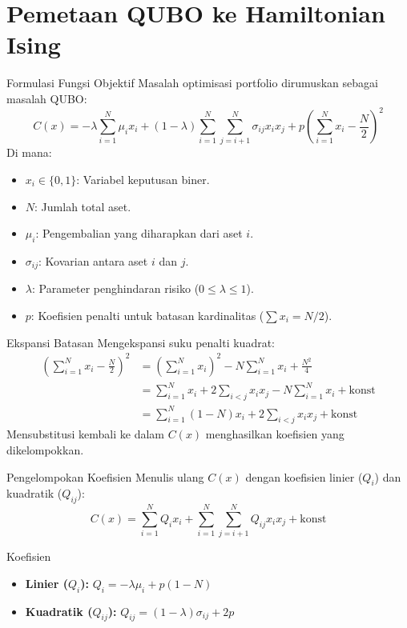 \section{Pemetaan QUBO ke Hamiltonian Ising}

\begin{frame}{Formulasi Fungsi Objektif}
    Masalah optimisasi portfolio dirumuskan sebagai masalah QUBO:
    \begin{equation}
        C(x) = -\lambda \sum_{i=1}^{N} \mu_i x_i + (1-\lambda) \sum_{i=1}^{N} \sum_{j=i+1}^{N} \sigma_{ij} x_i x_j + p \left( \sum_{i=1}^{N} x_i - \frac{N}{2} \right)^2
    \end{equation}
    Di mana:
    \begin{itemize}
        \item $x_i \in \{0, 1\}$: Variabel keputusan biner.
        \item $N$: Jumlah total aset.
        \item $\mu_i$: Pengembalian yang diharapkan dari aset $i$.
        \item $\sigma_{ij}$: Kovarian antara aset $i$ dan $j$.
        \item $\lambda$: Parameter penghindaran risiko ($0 \le \lambda \le 1$).
        \item $p$: Koefisien penalti untuk batasan kardinalitas ($\sum x_i = N/2$).
    \end{itemize}
\end{frame}

\begin{frame}{Ekspansi Batasan}
    Mengekspansi suku penalti kuadrat:
    \begin{align*}
        \left( \sum_{i=1}^{N} x_i - \frac{N}{2} \right)^2 &= \left( \sum_{i=1}^{N} x_i \right)^2 - N \sum_{i=1}^{N} x_i + \frac{N^2}{4} \\
        &= \sum_{i=1}^{N} x_i + 2 \sum_{i<j} x_i x_j - N \sum_{i=1}^{N} x_i + \text{konst} \\
        &= \sum_{i=1}^{N} (1 - N) x_i + 2 \sum_{i<j} x_i x_j + \text{konst}
    \end{align*}
    Mensubstitusi kembali ke dalam $C(x)$ menghasilkan koefisien yang dikelompokkan.
\end{frame}

\begin{frame}{Pengelompokan Koefisien}
    Menulis ulang $C(x)$ dengan koefisien linier ($Q_i$) dan kuadratik ($Q_{ij}$):
    \begin{equation}
        C(x) = \sum_{i=1}^{N} Q_i x_i + \sum_{i=1}^{N} \sum_{j=i+1}^{N} Q_{ij} x_i x_j + \text{konst}
    \end{equation}
    \begin{block}{Koefisien}
        \begin{itemize}
            \item \textbf{Linier ($Q_i$):}
            $Q_i = -\lambda \mu_i + p(1 - N)$
            \item \textbf{Kuadratik ($Q_{ij}$):}
            $Q_{ij} = (1-\lambda) \sigma_{ij} + 2p$
        \end{itemize}
    \end{block}
\end{frame}

